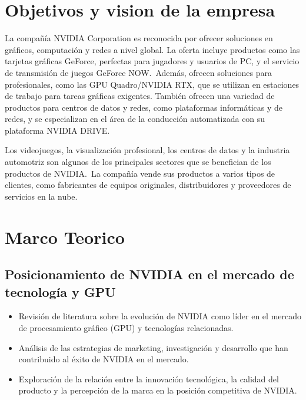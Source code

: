 \documentclass[conference]{IEEEtran}
\begin{document}
\section{Objetivos y vision de la empresa}

La compañía NVIDIA Corporation es reconocida por ofrecer soluciones
en gráficos, computación y redes a nivel global. La oferta incluye
productos como las tarjetas gráficas GeForce, perfectas para
jugadores y usuarios de PC, y el servicio de transmisión de
juegos GeForce NOW.~Además, ofrecen soluciones para
profesionales, como las GPU Quadro/NVIDIA RTX, que se
utilizan en estaciones de trabajo para tareas gráficas
exigentes. También ofrecen una variedad de productos
para centros de datos y redes, como plataformas
informáticas y de redes, y se especializan en el área
de la conducción automatizada con su plataforma NVIDIA DRIVE.\@{}

Los videojuegos, la visualización profesional, los centros
de datos y la industria automotriz son algunos de los
principales sectores que se benefician de los productos de NVIDIA.~La
compañía vende sus productos a varios tipos de clientes,
como fabricantes de equipos originales, distribuidores y
proveedores de servicios en la nube.

\section{Marco Teorico}

\subsection*{Posicionamiento de NVIDIA en el mercado de tecnología y GPU}

\begin{itemize}
	\item Revisión de literatura sobre la evolución de NVIDIA
	      como líder en el mercado de procesamiento gráfico (GPU) y
	      tecnologías relacionadas.

	\item Análisis de las estrategias de marketing,
	      investigación y desarrollo que han contribuido al éxito de
	      NVIDIA en el mercado.

	\item Exploración de la relación entre la innovación
	      tecnológica, la calidad del producto y la percepción de la
	      marca en la posición competitiva de NVIDIA.\@{}
\end{itemize}
\end{document}
